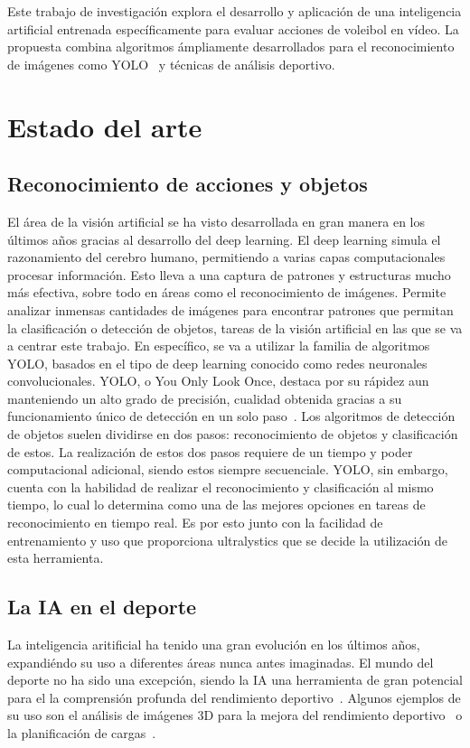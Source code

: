 \documentclass[12pt]{report} %
\begin{document}
    Este trabajo de investigación explora el desarrollo y aplicación de una
    inteligencia artificial entrenada específicamente para evaluar acciones de
    voleibol en vídeo. La propuesta combina algoritmos ámpliamente
    desarrollados para el reconocimiento de imágenes como YOLO~\cite{YOLO} y
    técnicas de análisis deportivo.

 

    \chapter{Estado del arte}
    \label{chap:estadoarte}

    \section{Reconocimiento de acciones y objetos}
    El área de la visión artificial se ha visto desarrollada en gran manera en
    los últimos años gracias al desarrollo del deep learning. El deep learning
    simula el razonamiento del cerebro humano, permitiendo a varias capas
    computacionales procesar información. Esto lleva a una captura de patrones
    y estructuras mucho más efectiva, sobre todo en áreas como el
    reconocimiento de imágenes. Permite analizar inmensas cantidades de
    imágenes para encontrar patrones que permitan la clasificación o detección
    de objetos, tareas de la visión artificial en las que se va a centrar este
    trabajo.  En específico, se va a utilizar la familia de algoritmos YOLO,
    basados en el tipo de deep learning conocido como redes neuronales
    convolucionales. YOLO, o You Only Look Once, destaca por su rápidez aun
    manteniendo un alto grado de precisión, cualidad obtenida gracias a su
    funcionamiento único de detección en un solo paso~\cite{JIANG20221066}. Los algoritmos de
    detección de objetos suelen dividirse en dos pasos: reconocimiento de
    objetos y clasificación de estos. La realización de estos dos pasos
    requiere de un tiempo y poder computacional adicional, siendo estos siempre
    secuenciale. YOLO, sin embargo, cuenta con la habilidad de realizar el
    reconocimiento y clasificación al mismo tiempo, lo cual lo determina como
    una de las mejores opciones en tareas de reconocimiento en tiempo real. Es
    por esto junto con la facilidad de entrenamiento y uso que proporciona
    ultralystics que se decide la utilización de esta herramienta.

    \section{La IA en el deporte}
    La inteligencia aritificial ha tenido una gran evolución en los últimos
    años, expandiéndo su uso a diferentes áreas nunca antes imaginadas. El
    mundo del deporte no ha sido una excepción, siendo la IA una herramienta de
    gran potencial para el la comprensión profunda del rendimiento
    deportivo~\cite{ia-sport}. Algunos ejemplos de su uso son el análisis de
    imágenes 3D para la mejora del rendimiento deportivo~\cite{analysis3d} o la
    planificación de cargas~\cite{wl}. 
\end{document}
